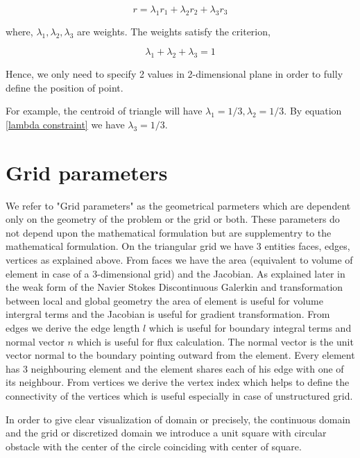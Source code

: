 \documentclass[a4paper,12pt]{book}
\begin{document}
\begin{equation}\label{barycentric point}
r = \lambda_1 r_1 + \lambda_2 r_2 + \lambda_3 r_3
\end{equation}

where, $\lambda_1, \lambda_2, \lambda_3$ are weights. The weights satisfy the criterion,

\begin{equation}\label{lambda constraint}
\lambda_1 + \lambda_2 + \lambda_3 = 1
\end{equation}

Hence, we only need to specify 2 values in 2-dimensional plane in order to fully define the position of point.

For example, the centroid of triangle will have $\lambda_1 = 1/3, \lambda_2 = 1/3$. By equation \eqref{lambda constraint} we have $\lambda_3=1/3$.

\section{Grid parameters}

We refer to "Grid parameters" as the geometrical parmeters which are dependent only on the geometry of the problem or the grid or both. These parameters do not depend upon the mathematical formulation but are supplementry to the mathematical formulation. On the triangular grid we have 3 entities faces, edges, vertices as explained above. From faces we have the area (equivalent to volume of element in case of a 3-dimensional grid) and the Jacobian. As explained later in the weak form of the Navier Stokes Discontinuous Galerkin and transformation between local and global geometry the area of element is useful for volume intergral terms and the Jacobian is useful for gradient transformation. From edges we derive the edge length $l$ which is useful for boundary integral terms and normal vector $n$ which is useful for flux calculation. The normal vector is the unit vector normal to the boundary pointing outward from the element. Every element has 3 neighbouring element and the element shares each of his edge with one of its neighbour. From vertices we derive the vertex index which helps to define the connectivity of the vertices which is useful especially in case of unstructured grid. 

In order to give clear visualization of domain or precisely, the continuous domain and the grid or discretized domain we introduce a unit square with circular obstacle with the center of the circle coinciding with center of square. 
\end{document}
